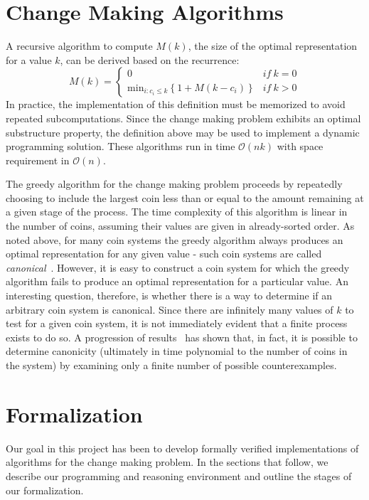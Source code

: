 \documentclass{sig-alternate}
\begin{document}
\section{Change Making Algorithms}

A recursive algorithm to compute $M(k)$, the size of the optimal representation for a value $k$, can be derived based on the recurrence:
\[
M(k) = \left\{ 
	\begin{array}{lr}
	0 & \textit{if}~k=0\\
	\textrm{min}_{i:c_i \le k}\left\{1 + M(k - c_i)\right\}   & \textit{if}~k>0
	\end{array}\right.
\]
In practice, the implementation of this definition must be memorized to avoid repeated subcomputations. Since the change making problem exhibits an optimal substructure property, the definition above may be used to implement a dynamic programming solution. These algorithms run in time $\mathcal{O}(nk)$ with space requirement in $\mathcal{O}(n)$. 


The greedy algorithm for the change making problem proceeds by repeatedly choosing to include the largest coin less than or equal to the amount remaining at a given stage of the process. The time complexity of this algorithm is linear in the number of coins, assuming their values are given in already-sorted order.  As noted above, for many coin systems the greedy algorithm always produces an optimal representation for any given value - such coin systems are called \emph{canonical}~\cite{martello90}. However, it is easy to construct a coin system for which the greedy algorithm fails to produce an optimal representation for a particular value. An interesting question, therefore, is whether there is a way to determine if an arbitrary coin system is canonical. Since there are infinitely many values of $k$ to test for a given coin system, it is not immediately evident that a finite process exists to do so. A progression of results~\cite{chang70,kozen94,pearson94} has shown that, in fact, it is possible to determine canonicity (ultimately in time polynomial to the number of coins in the system) by examining only a finite number of possible counterexamples. 


\section{Formalization}

Our goal in this project has been to develop formally verified implementations of algorithms for the change making problem. In the sections that follow, we describe our programming and reasoning environment and outline the stages of our formalization. 
\end{document}
